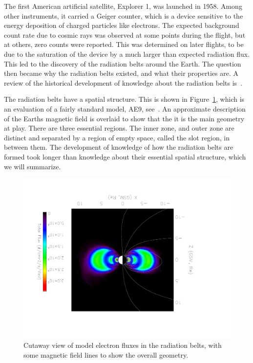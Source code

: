 The first American artificial satellite, Explorer 1, was launched in 1958. Among other instruments, it carried a Geiger counter, which is a device sensitive to the energy deposition of charged particles like electrons. The expected background count rate due to cosmic rays was observed at some points during the flight, but at others, zero counts were reported. This was determined on later flights, to be due to the saturation of the device by a much larger than expected radiation flux. This led to the discovery of the radiation belts around the Earth. The question then became why the radiation belts existed, and what their properties are. A review of the historical development of knowledge about the radiation belts is~\cite{baker2012}. 

The radiation belts have a spatial structure. This is shown in Figure~\ref{radbelts_structure}, which is an evaluation of a fairly standard model, AE9, see~\cite{ginet2013}. An approximate description of the Earths magnetic field is overlaid to show that the it is the main geometry at play. There are three essential regions. The inner zone, and outer zone are distinct and separated by a region of empty space, called the slot region, in between them. The development of knowledge of how the radiation belts are formed took longer than knowledge about their essential spatial structure, which we will summarize. 

\begin{figure}[p]
\label{radbelts_structure}
\centering
\includegraphics[width=1.0\textwidth,angle=180]{figures/chapter_2/radbelts_structure/radmodel}
\caption{Cutaway view of model electron fluxes in the radiation belts, with some magnetic field lines to show the overall geometry.}
\end{figure}

